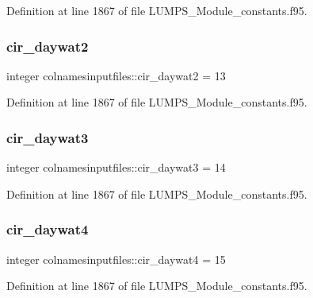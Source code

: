 Definition at line 1867 of file L\+U\+M\+P\+S\+\_\+\+Module\+\_\+constants.\+f95.

\mbox{\label{namespacecolnamesinputfiles_a46ac814b1f9e3860eda8b2d3f8b98022}} 
\subsubsection{\texorpdfstring{cir\+\_\+daywat2}{cir\_daywat2}}
{\footnotesize\ttfamily integer colnamesinputfiles\+::cir\+\_\+daywat2 = 13}



Definition at line 1867 of file L\+U\+M\+P\+S\+\_\+\+Module\+\_\+constants.\+f95.

\mbox{\label{namespacecolnamesinputfiles_a5fdc3e0318cb70a593a401c15baedb7a}} 
\subsubsection{\texorpdfstring{cir\+\_\+daywat3}{cir\_daywat3}}
{\footnotesize\ttfamily integer colnamesinputfiles\+::cir\+\_\+daywat3 = 14}



Definition at line 1867 of file L\+U\+M\+P\+S\+\_\+\+Module\+\_\+constants.\+f95.

\mbox{\label{namespacecolnamesinputfiles_aa29df165330619d23581d35254047bc7}} 
\subsubsection{\texorpdfstring{cir\+\_\+daywat4}{cir\_daywat4}}
{\footnotesize\ttfamily integer colnamesinputfiles\+::cir\+\_\+daywat4 = 15}



Definition at line 1867 of file L\+U\+M\+P\+S\+\_\+\+Module\+\_\+constants.\+f95.

